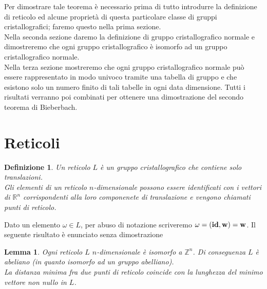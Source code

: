 \documentclass[a4paper,11pt,openright,twoside	]{book}
\newtheorem{definition}{Definizione}[section]
\newtheorem{lemma}[theorem]{Lemma}
\begin{document}
Per dimostrare tale teorema è necessario prima di tutto introdurre la definizione di reticolo ed alcune proprietà di questa particolare classe di gruppi cristallografici; faremo questo nella prima sezione. \\


Nella seconda sezione daremo la definizione di gruppo cristallografico normale e dimostreremo che ogni gruppo cristallografico è isomorfo ad un gruppo cristallografico normale. \\


Nella terza sezione mostreremo che ogni gruppo cristallografico normale può essere rappresentato in modo univoco tramite una tabella di gruppo e che esistono solo un numero finito di tali tabelle in ogni data dimensione. Tutti i risultati verranno poi combinati per ottenere una dimostrazione del secondo teorema di Bieberbach. 
\section{Reticoli}
\begin{definition}
Un reticolo $L$ è un gruppo cristallografico che contiene solo translazioni. \\
Gli elementi di un reticolo $n$-dimensionale possono essere identificati con i vettori di $\mathbb{R}^n$ corrispondenti alla loro componenete di translazione e vengono chiamati punti di reticolo. 
\end{definition}

Dato un elemento $\omega \in L$, per abuso di notazione scriveremo $\omega = (\vb{id, w} ) = \vb{w}$. 
Il seguente risultato è enunciato senza dimostrazione 
\begin{lemma}
Ogni reticolo $L$ $n$-dimensionale è isomorfo a $\mathbb{Z}^n$. Di conseguenza $L$ è abeliano (in quanto isomorfo ad un gruppo abelliano).\\
La distanza minima fra due punti di reticolo coincide con la lunghezza del minimo vettore non nullo in $L$.  
\end{lemma}
\end{document}
